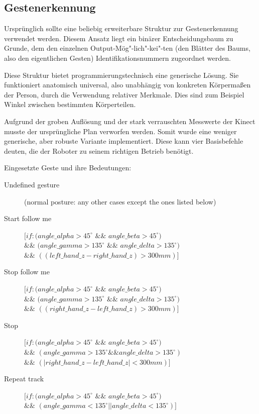 \subsection{Gestenerkennung}
\label{gestenerkennung_gestenerkennung_sec}
\authorsection{\editormarton}

Ursprünglich sollte eine beliebig erweiterbare Struktur zur Gestenerkennung verwendet werden.
 Diesem Ansatz liegt ein binärer Entscheidungsbaum zu Grunde, dem den einzelnen
 Output-Mög"-lich"-kei"-ten (den Blätter des Baums, also den eigentlichen
 Gesten) Identifikationsnummern zugeordnet werden.

Diese Struktur bietet programmierungstechnisch eine generische Lösung. Sie funktioniert anatomisch universal,
 also unabhängig von konkreten Körpermaßen der Person, durch die Verwendung relativer Merkmale.
 Dies sind zum Beispiel Winkel zwischen bestimmten Körperteilen.
 
Aufgrund der groben Auflösung und der stark verrauschten Messwerte der Kinect musste der ursprüngliche Plan verworfen werden.
 Somit wurde eine weniger generische, aber robuste Variante implementiert. Diese kann vier Basisbefehle deuten, die der Roboter zu seinem richtigen Betrieb benötigt.
\vspace{0.3cm}

\noindent Eingesetzte Geste und ihre Bedeutungen:
\begin{description}
  \item[Undefined gesture] (normal posture: any other cases except the ones
  listed below)
  \item[Start follow me] 
  $[if: (angle\_alpha > 45^\circ$ $\&\&$ $angle\_beta >
  45^\circ)$\\
  $\&\&$ $(angle\_gamma > 135^\circ$ $\&\&$ $angle\_delta >
  135^\circ)$\\
  $\&\&$ $((left\_hand\_z - right\_hand\_z) > 300 mm)]$
  \item[Stop follow me] $[if: (angle\_alpha > 45^\circ$ $\&\&$ $angle\_beta >
  45^\circ)$\\
  $\&\&$ $(angle\_gamma > 135^\circ$ $\&\&$ $angle\_delta > 135^\circ)$\\
  $\&\&$ $((right\_hand\_z - left\_hand\_z) > 300 mm)]$
  \item[Stop] $[if: (angle\_alpha > 45^\circ$ $\&\&$ $angle\_beta > 45^\circ)$\\
  $\&\&$ $(angle\_gamma > 135^\circ \&\& angle\_delta > 135^\circ)$\\
  $\&\&$ $(|right\_hand\_z - left\_hand\_z| < 300 mm)]$
  \item[Repeat track] $[if: (angle\_alpha > 45^\circ$ $\&\&$ $angle\_beta >
  45^\circ)$\\
  $\&\&$ $(angle\_gamma < 135^\circ || angle\_delta < 135^\circ)]$
\end{description}

